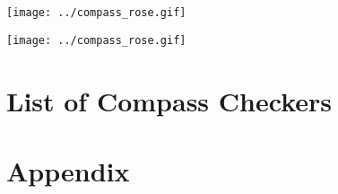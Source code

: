 \documentclass[10pt]{book}
\begin{document}
\label{Compass:postscriptVersionOfUserManual}

\begin{htmlonly}
   \centering \texttt{[image: ../compass\_rose.gif]}
\end{htmlonly}

\maketitle

\begin{htmlonly}
   \centering \texttt{[image: ../compass\_rose.gif]}
\end{htmlonly}



%

\newpage

%
%

\setcounter{tocdepth}{1}

\tableofcontents
\newpage
%



\newpage



\newpage



\newpage



\newpage



\newpage



\newpage




\newpage

\chapter{List of Compass Checkers}



\newpage
\chapter{Appendix}


\end{document}
